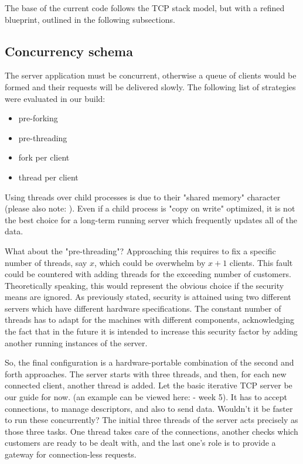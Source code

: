 \documentclass[runningheads]{llncs}
\begin{document}
The base of the current code follows the TCP stack model, but with a refined blueprint, outlined in the following subsections. 

\subsection{Concurrency schema}

The server application must be concurrent, otherwise a queue of clients would be formed and their requests will be delivered slowly. The following list of strategies were evaluated in our build:
\begin{itemize}
    \item pre-forking
    \item pre-threading
    \item fork per client
    \item thread per client
\end{itemize}

Using threads over child processes is due to their "shared memory" character (please also note: \cite{fork-vs-thread}). Even if a child process is "copy on write" optimized, it is not the best choice for a long-term running server which frequently updates all of the data. 

What about the "pre-threading"? Approaching this requires to fix a specific number of threads, say $x$, which could be overwhelm by $x + 1$ clients. This fault could be countered with adding threads for the exceeding number of customers. Theoretically speaking, this would represent the obvious choice if the security means are ignored. As previously stated, security is attained using two different servers which have different hardware specifications. The constant number of threads has to adapt for the machines with different components, acknowledging the fact that in the future it is intended to increase this security factor by adding another running instances of the server.

So, the final configuration is a hardware-portable combination of the second and forth approaches. The server starts with three threads, and then, for each new connected client, another thread is added. Let the basic iterative TCP server be our guide for now. (an example can be viewed here: \cite{course} - week 5). It has to accept connections, to manage descriptors, and also to send data. Wouldn't it be faster to run these concurrently? The initial three threads of the server acts precisely as those three tasks. One thread takes care of the connections, another checks which customers are ready to be dealt with, and the last one's role is to provide a gateway for connection-less requests.
\end{document}
